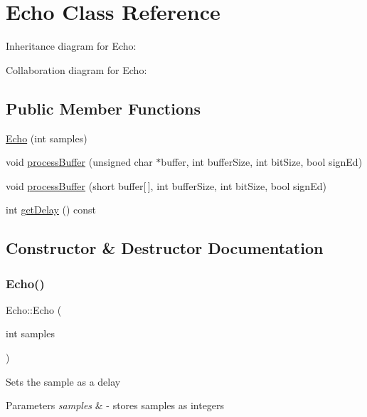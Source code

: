 \hypertarget{classEcho}{}\section{Echo Class Reference}
\label{classEcho}


Inheritance diagram for Echo\+:


Collaboration diagram for Echo\+:
\subsection*{Public Member Functions}
\begin{DoxyCompactItemize}
\item 
\hyperlink{classEcho_a35237dbafd1906efd27da3140de9f8f6}{Echo} (int samples)
\item 
void \hyperlink{classEcho_a74133ca41ed2cc1ff2fe3da3265742c4}{process\+Buffer} (unsigned char $\ast$buffer, int buffer\+Size, int bit\+Size, bool sign\+Ed)
\item 
void \hyperlink{classEcho_a8c737405020bdb4b7c07f08034971844}{process\+Buffer} (short buffer\mbox{[}$\,$\mbox{]}, int buffer\+Size, int bit\+Size, bool sign\+Ed)
\item 
int \hyperlink{classEcho_aaf73eea3703793b47edb3a34991183c6}{get\+Delay} () const
\end{DoxyCompactItemize}


\subsection{Constructor \& Destructor Documentation}
\mbox{\label{classEcho_a35237dbafd1906efd27da3140de9f8f6}} 
\subsubsection{\texorpdfstring{Echo()}{Echo()}}
{\footnotesize\ttfamily Echo\+::\+Echo (\begin{DoxyParamCaption}\item[{int}]{samples }\end{DoxyParamCaption})}

Sets the sample as a delay 
\begin{DoxyParams}{Parameters}
{\em samples} & -\/ stores samples as integers \\
\hline
\end{DoxyParams}


